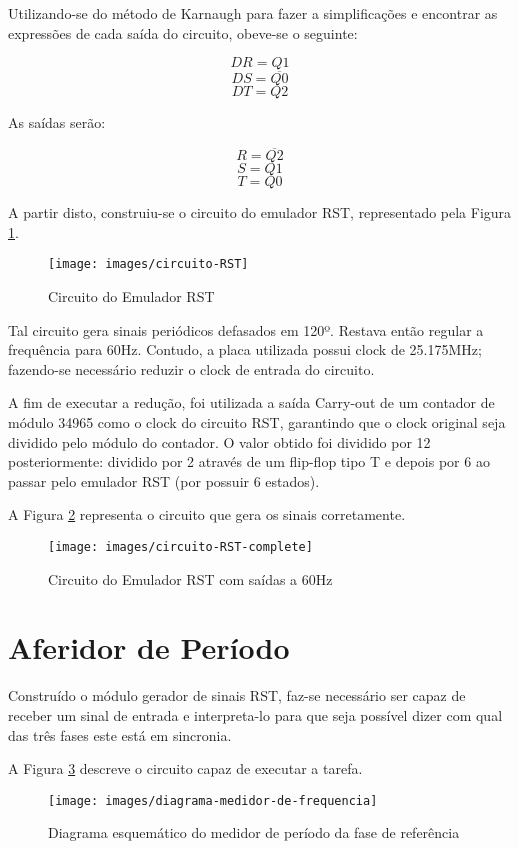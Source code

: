 \documentclass[12pt,a4paper,openany]{abntex2}
\begin{document}
Utilizando-se do método de Karnaugh para fazer a simplificações e encontrar as expressões de cada saída do circuito, obeve-se o seguinte:

$$DR = Q1$$
$$DS = \overline{Q0}$$
$$DT = Q2$$

As saídas serão:

$$R = \overline{Q2}$$
$$S = Q1$$
$$T = Q0$$

A partir disto, construiu-se o circuito do emulador RST, representado pela Figura \ref{fig:circuito-RST}.

\begin{figure}[!htp]
	\centering
	\caption{Circuito do Emulador RST}
	\texttt{[image: images/circuito-RST]}
	\label{fig:circuito-RST}
\end{figure}

Tal circuito gera sinais periódicos defasados em 120º. Restava então regular a frequência para 60Hz. Contudo, a placa utilizada possui clock de 25.175MHz; fazendo-se necessário reduzir o clock de entrada do circuito. 

A fim de executar a redução, foi utilizada a saída Carry-out de um contador de módulo 34965 como o clock do circuito RST, garantindo que o clock original seja dividido pelo módulo do contador. O valor obtido foi dividido por 12 posteriormente: dividido por 2 através de um flip-flop tipo T e depois por 6 ao passar pelo emulador RST (por possuir 6 estados).

A Figura \ref{fig:circuito-RST-complete} representa o circuito que gera os sinais corretamente.

\begin{figure}[!htp]
	\centering
	\caption{Circuito do Emulador RST com saídas a 60Hz}
	\texttt{[image: images/circuito-RST-complete]}
	\label{fig:circuito-RST-complete}
\end{figure}

\section{Aferidor de Período}

Construído o módulo gerador de sinais RST, faz-se necessário ser capaz de receber um sinal de entrada e interpreta-lo para que seja possível dizer com qual das três fases este está em sincronia. 

A  Figura \ref{fig:diagrama-medidor-de-frequencia} descreve o circuito capaz de executar a tarefa.

\begin{figure}[!htp]
	\centering
	\caption{Diagrama esquemático do medidor de período da fase de referência}
	\texttt{[image: images/diagrama-medidor-de-frequencia]}
	\label{fig:diagrama-medidor-de-frequencia}
\end{figure}
\end{document}
